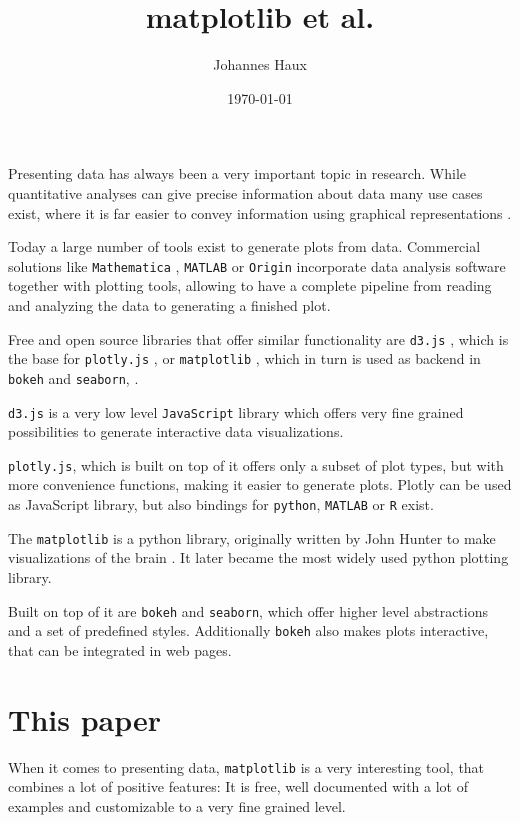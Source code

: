 \documentclass[a4paper, 11pt, onecolumn]{article}
\title{matplotlib et al.}
\author{Johannes Haux}
\date{\today}
\newcommand{\mpl}{\texttt{matplotlib}\xspace}
\newcommand{\pl}[1]{\mbox{\texttt{#1}\xspace}}
\begin{document}
\maketitle


Presenting data has always been a very important topic in research. 
While quantitative analyses can give precise information about data many
use cases exist, where it is far easier to convey information using graphical
representations 
\cite{plotsarecool}.

Today a large number of tools exist to generate plots from data.  Commercial
solutions like \pl{Mathematica} \cite{mate}, \pl{MATLAB} \cite{matl} or
\pl{Origin} \cite{orig} incorporate data analysis software together with
plotting tools, allowing to have a complete pipeline from reading and analyzing
the data to generating a finished plot.

Free and open source libraries that offer similar functionality are \pl{d3.js}
\cite{d3js}, which is the base for \pl{plotly.js} \cite{plotly}, or \mpl
\cite{mpl}, which in turn is used as backend in \pl{bokeh} \cite{bokeh} and
\pl{seaborn}, \cite{seaborn}.

\pl{d3.js} is a very low level \pl{JavaScript} library which offers very
fine grained possibilities to generate interactive data visualizations.

\pl{plotly.js}, which is built on top of it offers only a subset of plot types,
but with more convenience functions, making it easier to generate plots. 
Plotly can be used as JavaScript library, but also bindings for \pl{python}, 
\pl{MATLAB} or \pl{R} exist.

The \mpl is a python library, originally written by John Hunter to make 
visualizations of the brain \cite{john}. It later became the most widely used
python plotting library.

Built on top of it are \pl{bokeh} and \pl{seaborn}, which offer higher level
abstractions and a set of predefined styles. Additionally \pl{bokeh} also
makes plots interactive, that can be integrated in web pages.


\section{This paper}

When it comes to presenting data, \mpl is a very interesting
tool, that combines a lot of positive features:
It is 
free,
well documented with a lot of examples and
customizable to a very fine grained level.
\end{document}

